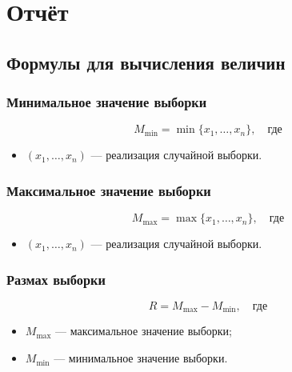 
\section{Отчёт}

\subsection{Формулы для вычисления величин}

\subsubsection{Минимальное значение выборки}

\begin{equation}
    M_{\min} = \min \{ x_1, \dots, x_n\}, \quad \text{где}
\end{equation}
\begin{itemize}
    \item $(x_1, \dots, x_n)$ --- реализация случайной выборки.
\end{itemize}


\subsubsection{Максимальное значение выборки}

\begin{equation}
    M_{\max} = \max \{ x_1, \dots, x_n\}, \quad \text{где}
\end{equation}
\begin{itemize}
    \item $(x_1, \dots, x_n)$ --- реализация случайной выборки.
\end{itemize}


\subsubsection{Размах выборки}

\begin{equation}
    R = M_{\max} - M_{\min}, \quad \text{где}
\end{equation}
\begin{itemize}
    \item $M_{\max}$ --- максимальное значение выборки;
    \item $M_{\min}$ --- минимальное значение выборки.
\end{itemize}


